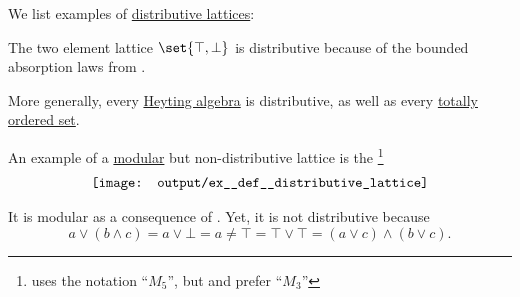 \begin{example}\label{ex:def:distributive_lattice}
  We list examples of \hyperref[def:distributive_lattice]{distributive lattices}:
  \begin{thmenum}
     The two element lattice \( \set{ \top, \bot } \) is distributive because of the bounded absorption laws from .

    More generally, every \hyperref[def:heyting_algebra]{Heyting algebra} is distributive, as well as every \hyperref[def:totally_ordered_set]{totally ordered set}.

     An example of a \hyperref[def:modular_lattice]{modular} but non-distributive lattice is the \footnote{ uses the notation \enquote{\( M_5 \)}, but  and  prefer \enquote{\( M_3 \)}}
    \begin{equation*}\taglabel[\logic{\( M_3 \)}]{eq:ex:def:distributive_lattice/diamond}
      \begin{aligned}
        \texttt{[image: output/ex\_\_def\_\_distributive\_lattice]}
      \end{aligned}
    \end{equation*}

    It is modular as a consequence of . Yet, it is not distributive because
    \begin{equation*}
      a \vee (b \wedge c) = a \vee \bot = a
      \neq
      \top = \top \vee \top = (a \vee c) \wedge (b \vee c).
    \end{equation*}
  \end{thmenum}
\end{example}

